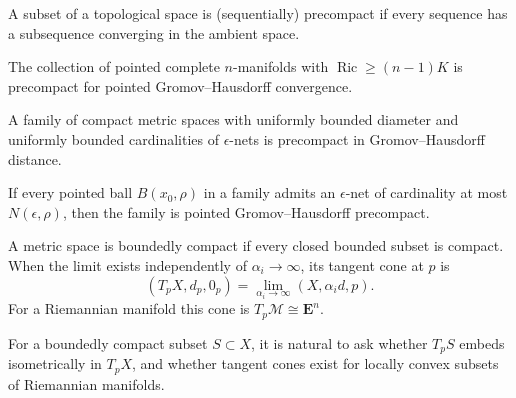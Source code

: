 \begin{definition}[Precompactness]
\label{def:chow-iii-g16-precompactness}
A subset of a topological space is (sequentially) precompact if every sequence
has a subsequence converging in the ambient space.
\end{definition}

\begin{theorem}
\label{thm:chow-iii-g17-gromov-precompactness}
The collection of pointed complete $n$-manifolds with
$\operatorname{Ric}\ge(n-1)K$ is precompact for pointed
Gromov--Hausdorff convergence.
\end{theorem}

\begin{theorem}
\label{thm:chow-iii-g18-total-boundedness}
A family of compact metric spaces with uniformly bounded diameter and uniformly
bounded cardinalities of $\epsilon$-nets is precompact in Gromov--Hausdorff
distance.
\end{theorem}

\begin{theorem}
\label{thm:chow-iii-g19-pointed-total-boundedness}
If every pointed ball $B(x_0,\rho)$ in a family admits an $\epsilon$-net of
cardinality at most $N(\epsilon,\rho)$, then the family is pointed
Gromov--Hausdorff precompact.
\end{theorem}

\begin{definition}
\label{def:chow-iii-g20-tangent-cone}
A metric space is boundedly compact if every closed bounded subset is compact.
When the limit exists independently of $\alpha_i\to\infty$, its tangent cone at
$p$ is
\[
(T_pX,d_p,0_p)=\lim_{\alpha_i\to\infty}(X,\alpha_i d,p).
\]
For a Riemannian manifold this cone is $T_p\mathcal M\cong\mathbf E^n$.
\end{definition}

\begin{remark}
\label{rem:chow-iii-g21-g22-tangent-questions}
For a boundedly compact subset $S\subset X$, it is natural to ask whether
$T_pS$ embeds isometrically in $T_pX$, and whether tangent cones exist for
locally convex subsets of Riemannian manifolds.
\end{remark}

